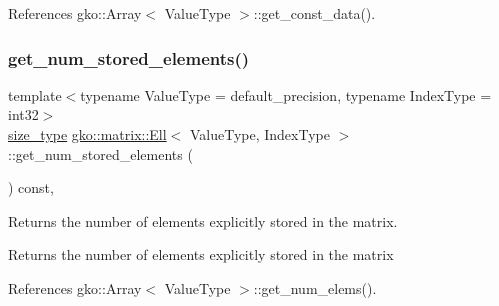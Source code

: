 References gko\+::\+Array$<$ Value\+Type $>$\+::get\+\_\+const\+\_\+data().

\mbox{\label{classgko_1_1matrix_1_1Ell_aecca4e9cfb1e81958881c6dc3e2aa06f}} 
\subsubsection{\texorpdfstring{get\+\_\+num\+\_\+stored\+\_\+elements()}{get\_num\_stored\_elements()}}
{\footnotesize\ttfamily template$<$typename Value\+Type = default\+\_\+precision, typename Index\+Type = int32$>$ \\
\hyperlink{namespacegko_a6e5c95df0ae4e47aab2f604a22d98ee7}{size\+\_\+type} \hyperlink{classgko_1_1matrix_1_1Ell}{gko\+::matrix\+::\+Ell}$<$ Value\+Type, Index\+Type $>$\+::get\+\_\+num\+\_\+stored\+\_\+elements (\begin{DoxyParamCaption}{ }\end{DoxyParamCaption}) const\hspace{0.3cm}{\ttfamily [inline]}, {\ttfamily [noexcept]}}



Returns the number of elements explicitly stored in the matrix. 

\begin{DoxyReturn}{Returns}
the number of elements explicitly stored in the matrix 
\end{DoxyReturn}


References gko\+::\+Array$<$ Value\+Type $>$\+::get\+\_\+num\+\_\+elems().

\mbox{\label{classgko_1_1matrix_1_1Ell_a08f9b04b356e58ab57d03ce335ff11ce}} 

